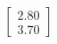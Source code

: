 \documentclass[preview]{standalone}
\begin{document}
\begin{align*}
\begin{bmatrix} 2.80 \\ 3.70 \end{bmatrix}
\end{align*}
\end{document}
